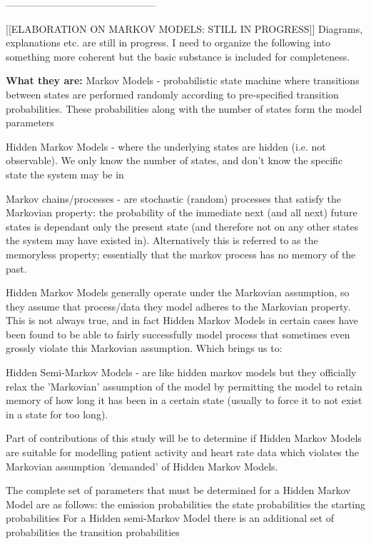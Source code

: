 \documentclass[]{article}
\begin{document}
---------------------------------------------

{\centering\large [[ELABORATION ON MARKOV MODELS: STILL IN PROGRESS]]}
Diagrams, explanations etc. are still in progress. I need to organize the following into something more coherent but the basic substance is included for completeness.

\textbf{What they are:}
Markov Models - probabilistic state machine where transitions between states are performed randomly according to pre-specified transition probabilities. These probabilities along with the number of states form the model parameters

Hidden Markov Models - where the underlying states are hidden (i.e. not observable). We only know the number of states, and don't know the specific state the system may be in

Markov chains/processes - are stochastic (random) processes that satisfy the Markovian property: the probability of the immediate next (and all next) future states is dependant only the present state (and therefore not on any other states the system may have existed in). Alternatively this is referred to as the memoryless property; essentially that the markov process has no memory of the past.

Hidden Markov Models generally operate under the Markovian assumption, so they assume that process/data they model adheres to the Markovian property. This is not always true, and in fact Hidden Markov Models in certain cases have been found to be able to fairly successfully model process that sometimes even grossly violate this Markovian assumption. Which brings us to:

Hidden Semi-Markov Models - are like hidden markov models but they officially relax the 'Markovian' assumption of the model by permitting the model to retain memory of how long it has been in a certain state (usually to force it to not exist in a state for too long).

Part of contributions of this study will be to determine if Hidden Markov Models are suitable for modelling patient activity and heart rate data which violates the Markovian assumption 'demanded' of Hidden Markov Models.

The complete set of parameters that must be determined for a Hidden Markov Model are as follows:
the emission probabilities
the state probabilities
the starting probabilities
For a Hidden semi-Markov Model there is an additional set of probabilities
the transition probabilities
\end{document}
